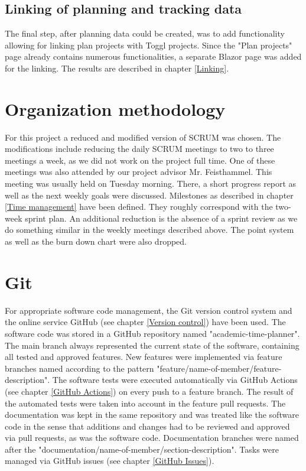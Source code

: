 \subsection{Linking of planning and tracking data}
The final step, after planning data could be created, was to add functionality allowing for linking plan projects with Toggl projects. Since the "Plan projects" page already contains
numerous functionalities, a separate Blazor page was added for the linking. The results are described in chapter \ref{Linking}.

\section{Organization methodology}
For this project a reduced and modified version of SCRUM \cite{scrum_url} was chosen. The modifications include reducing the daily SCRUM meetings to two to three meetings a week, as we did not work on the project full time. One of these meetings was also attended by our project advisor Mr. Feisthammel. This meeting was usually held on Tuesday morning. There, a short progress report as well as the next weekly goals were discussed. Milestones as described in chapter \ref{Time management} have been defined. They roughly correspond with the two-week sprint plan. An additional reduction is the absence of a sprint review as we do something similar in the weekly meetings described above. The point system as well as the burn down chart were also dropped.

\section{Git}
For appropriate software code management, the Git version control system and the online service GitHub (see chapter \ref{Version control}) have been used. The software code was stored in a GitHub repository named "academic-time-planner". The main branch always represented the current state of the software, containing all tested and approved features. New features were implemented via feature branches named according to the pattern "feature/name-of-member/feature-description". The software tests were executed automatically via GitHub Actions (see chapter \ref{GitHub Actions}) on every push to a feature branch. The result of the automated tests were taken into account in the feature pull requests. The documentation was kept in the same repository and was treated like the software code in the sense that additions and changes had to be reviewed and approved via pull requests, as was the software code. Documentation branches were named after the "documentation/name-of-member/section-description". Tasks were managed via GitHub issues (see chapter \ref{GitHub Issues}).

